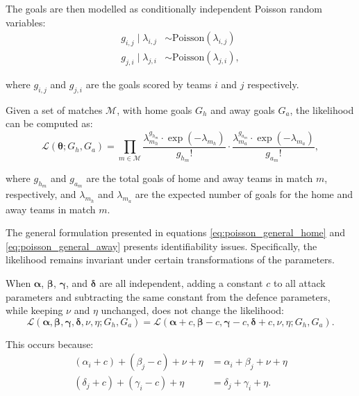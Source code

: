 The goals are then modelled as conditionally independent Poisson random variables:
\begin{align}
    \label{eq:poisson_general_dist_home}
    g_{i,j} \mid \lambda_{i,j} &\sim \text{Poisson}(\lambda_{i,j}) \\
    \label{eq:poisson_general_dist_away}
    g_{j,i} \mid \lambda_{j,i} &\sim \text{Poisson}(\lambda_{j,i}),
\end{align}

\noindent where $g_{i,j}$ and $g_{j,i}$ are the goals scored by teams $i$ and $j$ respectively.

Given a set of matches $\mathcal{M}$, with home goals $G_h$ and away goals $G_a$, the likelihood can be computed as:
\begin{equation}
    \label{eq:poisson_general_likelihood}
    \mathcal{L}(\boldsymbol{\theta} ; G_h, G_a) = \prod_{m \in \mathcal{M}} \frac{\lambda_{m_h}^{g_{h_m}} \cdot \exp(-\lambda_{m_h})}{g_{h_m}!} \cdot \frac{\lambda_{m_a}^{g_{a_m}} \cdot \exp(-\lambda_{m_a})}{g_{a_m}!},
\end{equation}

\noindent where $g_{h_m}$ and $g_{a_m}$ are the total goals of home and away teams in match $m$, respectively, and $\lambda_{m_h}$ and $\lambda_{m_a}$ are the expected number of goals for the home and away teams in match $m$.

The general formulation presented in equations \ref{eq:poisson_general_home} and \ref{eq:poisson_general_away} presents identifiability issues.
Specifically, the likelihood remains invariant under certain transformations of the parameters.

When $\boldsymbol{\alpha}$, $\boldsymbol{\beta}$, $\boldsymbol{\gamma}$, and $\boldsymbol{\delta}$ are all independent, adding a constant $c$ to all attack parameters and subtracting the same constant from the defence parameters, while keeping $\nu$ and $\eta$ unchanged, does not change the likelihood:
\begin{equation}
    \mathcal{L}(\boldsymbol{\alpha}, \boldsymbol{\beta}, \boldsymbol{\gamma}, \boldsymbol{\delta}, \nu, \eta ; G_h, G_a) = \mathcal{L}(\boldsymbol{\alpha} + c, \boldsymbol{\beta} - c, \boldsymbol{\gamma} - c, \boldsymbol{\delta} + c, \nu, \eta ; G_h, G_a).
\end{equation}

This occurs because:
\begin{align*}
    (\alpha_i + c) + (\beta_j - c) + \nu + \eta &= \alpha_i + \beta_j + \nu + \eta \\
    (\delta_j + c) + (\gamma_i - c) + \eta &= \delta_j + \gamma_i + \eta.
\end{align*}

